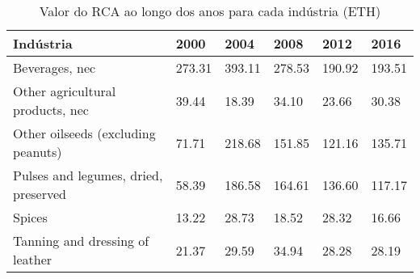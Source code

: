 \begin{table}
\centering
\caption{Valor do RCA ao longo dos anos para cada indústria (ETH)}
\label{tab:ex3-tempo-ETH}
\begin{tabular}{p{6cm}p{1.5cm}p{1.5cm}p{1.5cm}p{1.5cm}p{1.5cm}}
\toprule
                           Indústria &   2000 &   2004 &   2008 &   2012 &   2016 \\
\midrule
                      Beverages, nec & 273.31 & 393.11 & 278.53 & 190.92 & 193.51 \\
    Other agricultural products, nec &  39.44 &  18.39 &  34.10 &  23.66 &  30.38 \\
  Other oilseeds (excluding peanuts) &  71.71 & 218.68 & 151.85 & 121.16 & 135.71 \\
Pulses and legumes, dried, preserved &  58.39 & 186.58 & 164.61 & 136.60 & 117.17 \\
                              Spices &  13.22 &  28.73 &  18.52 &  28.32 &  16.66 \\
     Tanning and dressing of leather &  21.37 &  29.59 &  34.94 &  28.28 &  28.19 \\
\bottomrule
\end{tabular}
\end{table}
